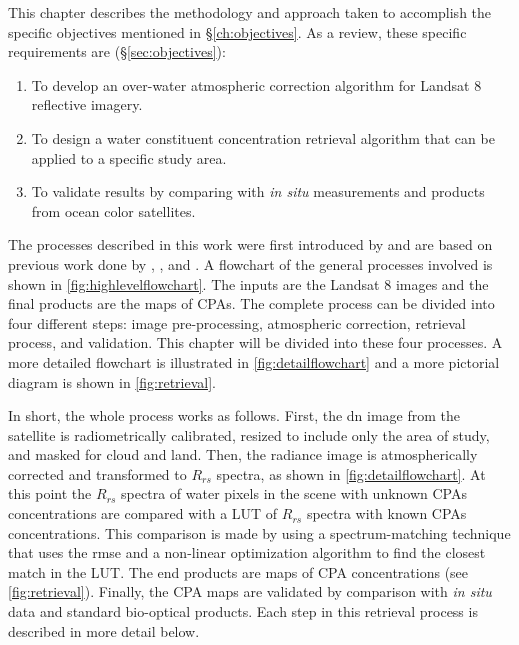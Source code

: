 This chapter describes the methodology and approach taken to accomplish the specific objectives mentioned in \S\ref{ch:objectives}. As a review, these specific requirements are (\S\ref{sec:objectives}):
\begin{enumerate}
  \item To develop an over-water atmospheric correction algorithm for Landsat 8 reflective imagery.
  \item To design a water constituent concentration retrieval algorithm that can be applied to a specific study area.
  \item To validate results by comparing with {\it in situ} measurements and products from ocean color satellites.
\end{enumerate}

The processes described in this work were first introduced by \citet{Concha2013IGARSS} and are based on previous work done by \citet{Raqueno:2000}, \citet{Gerace:2012}, \citet{Pahlevan:2012b} and \citet{Gerace:2013}. A flowchart of the general processes involved is shown in \autoref{fig:highlevelflowchart}. The inputs are the Landsat 8 images and the final products are the maps of CPAs. The complete process can be divided into four different steps: image pre-processing, atmospheric correction, retrieval process, and validation. This chapter will be divided into these four processes. A more detailed flowchart is illustrated in \autoref{fig:detailflowchart} and a more pictorial diagram is shown in \autoref{fig:retrieval}.

In short, the whole process works as follows. First, the \gls{dn} image from the satellite is radiometrically calibrated, resized to include only the area of study, and masked for cloud and land. Then, the radiance image is atmospherically corrected and transformed to $R_{rs}$ spectra, as shown in \autoref{fig:detailflowchart}. At this point the $R_{rs}$ spectra of water pixels in the scene with unknown CPAs concentrations are compared with a LUT of $R_{rs}$ spectra with known CPAs concentrations. This comparison is made by using a spectrum-matching technique \citep{Raqueno:2000,Mobley:2005} that uses the \gls{rmse} and a non-linear optimization algorithm to find the closest match in the LUT. The end products are maps of CPA concentrations (see \autoref{fig:retrieval}). Finally, the CPA maps are validated by comparison with {\it in situ} data and standard bio-optical products. Each step in this retrieval process is described in more detail below.

